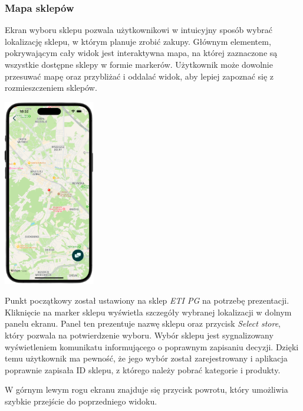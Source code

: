 \subsubsection{Mapa sklepów}

Ekran wyboru sklepu pozwala użytkownikowi w intuicyjny sposób wybrać lokalizację sklepu, w którym planuje zrobić zakupy. Głównym elementem, pokrywającym cały widok jest interaktywna mapa, na której zaznaczone są wszystkie dostępne sklepy w formie markerów. Użytkownik może dowolnie przesuwać mapę oraz przybliżać i oddalać widok, aby lepiej zapoznać się z rozmieszczeniem sklepów. 

\begin{center}
\includegraphics[width=0.3\textwidth]{images/front/store_page.png}
\end{center}

Punkt początkowy został ustawiony na sklep \textit{ETI PG} na potrzebę prezentacji. Kliknięcie na marker sklepu wyświetla szczegóły wybranej lokalizacji w dolnym panelu ekranu. Panel ten prezentuje nazwę sklepu oraz przycisk \textit{Select store}, który pozwala na potwierdzenie wyboru. Wybór sklepu jest sygnalizowany wyświetleniem komunikatu informującego o poprawnym zapisaniu decyzji. Dzięki temu użytkownik ma pewność, że jego wybór został zarejestrowany i aplikacja poprawnie zapisała ID sklepu, z którego należy pobrać kategorie i produkty.

W górnym lewym rogu ekranu znajduje się przycisk powrotu, który umożliwia szybkie przejście do poprzedniego widoku. 

